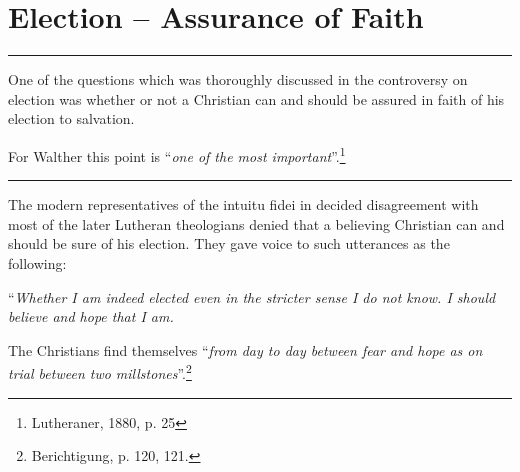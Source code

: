 \chapter{Election -- Assurance of Faith}
\hrule
\vspace{.30cm}   One of the questions which was thoroughly discussed in the controversy on election was whether or not a Christian can and should be assured in faith of his election to salvation.  \par For Walther this point is “\textit{one of the most important}”.\footnote{Lutheraner, 1880, p. 25}
\vspace{.30cm}
\hrule
\vspace{1.25cm}
                The modern representatives of the intuitu fidei in decided disagreement with most of the later Lutheran theologians denied that a believing Christian can and should be sure of his election.  They gave voice to such utterances as the following: \begin{displayquote} “\textit{Whether I am indeed elected even in the stricter sense I do not know.  I should believe and hope that I am.}\end{displayquote}  The Christians find themselves “\textit{from day to day between fear and hope as on trial between two millstones}”.\footnote{Berichtigung, p. 120, 121.}

